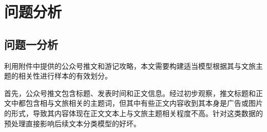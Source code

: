 \documentclass[bwprint]{gmcmthesis}
\begin{document}




\section{问题分析}

\subsection{问题一分析}
利用附件中提供的公众号推文和游记攻略，本文需要构建适当模型根据其与文旅主题的相关性进行样本的有效划分。

首先，公众号推文包含标题、发表时间和正文信息。经过初步观察，推文标题和正文中都包含相与文旅相关的主题词，但其中有些正文内容收到其本身是广告或图片的形式，导致其内容体现在正文文本上与文旅主题相关程度不高。针对这类数据的预处理直接影响后续文本分类模型的好坏。
\end{document}
